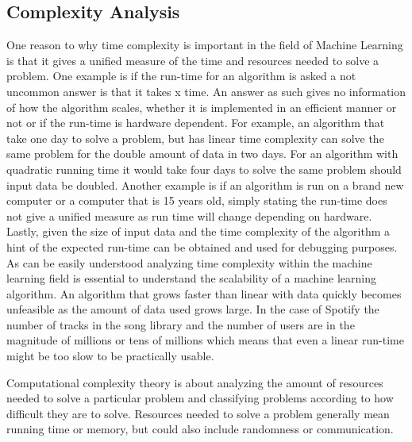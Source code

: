 \documentclass[a4paper,11pt]{kth-mag}
\begin{document}
\subsection{Complexity Analysis}
One reason to why time complexity is important in the field of Machine Learning is that it gives a unified measure of the time and resources needed to solve a problem. One example is if the run-time for an algorithm is asked a not uncommon answer is that it takes x time. An answer as such gives no information of how the algorithm scales, whether it is implemented in an efficient manner or not or if the run-time is hardware dependent. For example, an algorithm that take one day to solve a problem, but has linear time complexity can solve the same problem for the double amount of data in two days. For an algorithm with quadratic running time it would take four days to solve the same problem should input data be doubled. Another example is if an algorithm is run on a brand new computer or a computer that is 15 years old, simply stating the run-time does not give a unified measure as run time will change depending on hardware. Lastly, given the size of input data and the time complexity of the algorithm a hint of the expected run-time can be obtained and used for debugging purposes.
 As can be easily understood analyzing time complexity within the machine learning field is essential to understand the scalability of a machine learning algorithm. An algorithm that grows faster than linear with data quickly becomes unfeasible as the amount of data used grows large. In the case of Spotify the number of tracks in the song library and the number of users are in the magnitude of millions or tens of millions which means that even a linear run-time might be too slow to be practically usable.
 
Computational complexity theory is about analyzing the amount of resources needed to solve a particular problem and classifying problems according to how difficult they are to solve. Resources needed to solve a problem generally mean running time or memory, but could also include randomness or communication. 
\end{document}
